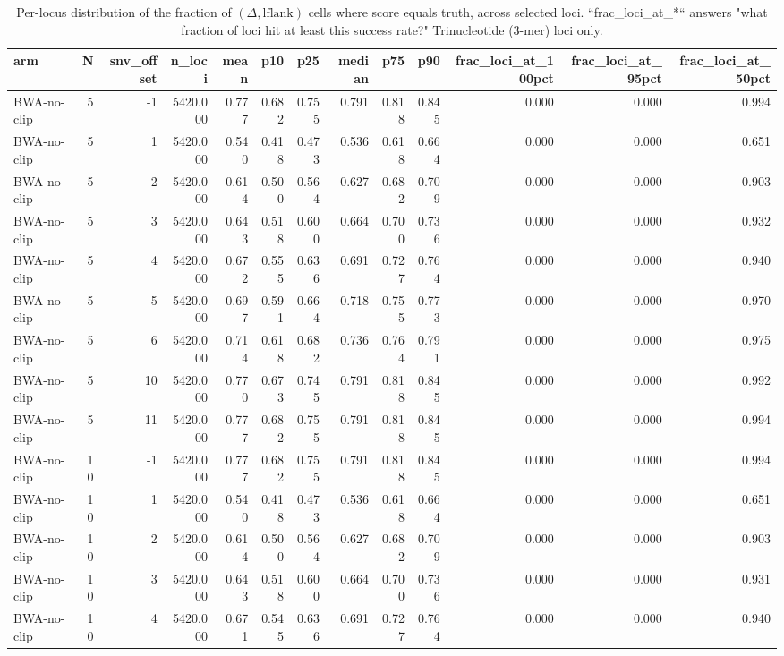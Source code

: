 \begin{table}
\caption{Per-locus distribution of the fraction of $(\Delta, \text{lflank})$ cells where score equals truth, across selected loci.  ``frac\_loci\_at\_*`` answers "what fraction of loci hit at least this success rate?"  Trinucleotide (3-mer) loci only.}
\label{tab:single-per-locus-distribution}
\begin{tabular}{lrrrrrrrrrrrr}
\toprule
arm & N & snv_offset & n_loci & mean & p10 & p25 & median & p75 & p90 & frac_loci_at_100pct & frac_loci_at_95pct & frac_loci_at_50pct \\
\midrule
BWA-no-clip & 5 & -1 & 5420.000 & 0.777 & 0.682 & 0.755 & 0.791 & 0.818 & 0.845 & 0.000 & 0.000 & 0.994 \\
BWA-no-clip & 5 & 1 & 5420.000 & 0.540 & 0.418 & 0.473 & 0.536 & 0.618 & 0.664 & 0.000 & 0.000 & 0.651 \\
BWA-no-clip & 5 & 2 & 5420.000 & 0.614 & 0.500 & 0.564 & 0.627 & 0.682 & 0.709 & 0.000 & 0.000 & 0.903 \\
BWA-no-clip & 5 & 3 & 5420.000 & 0.643 & 0.518 & 0.600 & 0.664 & 0.700 & 0.736 & 0.000 & 0.000 & 0.932 \\
BWA-no-clip & 5 & 4 & 5420.000 & 0.672 & 0.555 & 0.636 & 0.691 & 0.727 & 0.764 & 0.000 & 0.000 & 0.940 \\
BWA-no-clip & 5 & 5 & 5420.000 & 0.697 & 0.591 & 0.664 & 0.718 & 0.755 & 0.773 & 0.000 & 0.000 & 0.970 \\
BWA-no-clip & 5 & 6 & 5420.000 & 0.714 & 0.618 & 0.682 & 0.736 & 0.764 & 0.791 & 0.000 & 0.000 & 0.975 \\
BWA-no-clip & 5 & 10 & 5420.000 & 0.770 & 0.673 & 0.745 & 0.791 & 0.818 & 0.845 & 0.000 & 0.000 & 0.992 \\
BWA-no-clip & 5 & 11 & 5420.000 & 0.777 & 0.682 & 0.755 & 0.791 & 0.818 & 0.845 & 0.000 & 0.000 & 0.994 \\
BWA-no-clip & 10 & -1 & 5420.000 & 0.777 & 0.682 & 0.755 & 0.791 & 0.818 & 0.845 & 0.000 & 0.000 & 0.994 \\
BWA-no-clip & 10 & 1 & 5420.000 & 0.540 & 0.418 & 0.473 & 0.536 & 0.618 & 0.664 & 0.000 & 0.000 & 0.651 \\
BWA-no-clip & 10 & 2 & 5420.000 & 0.614 & 0.500 & 0.564 & 0.627 & 0.682 & 0.709 & 0.000 & 0.000 & 0.903 \\
BWA-no-clip & 10 & 3 & 5420.000 & 0.643 & 0.518 & 0.600 & 0.664 & 0.700 & 0.736 & 0.000 & 0.000 & 0.931 \\
BWA-no-clip & 10 & 4 & 5420.000 & 0.671 & 0.545 & 0.636 & 0.691 & 0.727 & 0.764 & 0.000 & 0.000 & 0.940 \\

\end{tabular}
\end{table}
